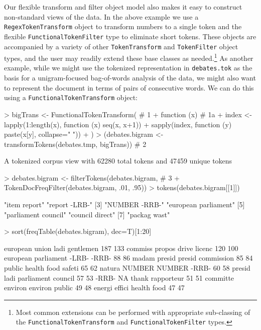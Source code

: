 \documentclass[11pt]{article}
\let\code=\texttt
\let\rclass=\texttt
\begin{document}
Our flexible transform and filter object model also makes it easy to
construct non-standard views of the data.  In the above example we use
a \rclass{RegexTokenTransform} object to transform numbers to a single
token and the flexible \rclass{FunctionalTokenFilter} type to
eliminate short tokens.  These objects are accompanied by a variety of
other \rclass{TokenTransform} and \rclass{TokenFilter} object types,
and the user may readily extend these base classes as
needed.\footnote{Most common extensions can be performed with
appropriate sub-classing of the \rclass{FunctionalTokenTransform} and
\rclass{FunctionalTokenFilter} types.}  As another example, while we
might use the tokenized representation in \code{debates.tok} as the
basis for a unigram-focused bag-of-words analysis of the data, we
might also want to represent the document in terms of pairs of
consecutive words.  We can do this using a
\rclass{FunctionalTokenTransform} object:
\begin{Schunk}
\begin{Sinput}
> bigTrans <- FunctionalTokenTransform(                         # 1
+   function (x) {                                              # 1a
+     index <- lapply(1:length(x), function (x) seq(x, x+1))
+     sapply(index, function (y) paste(x[y], collapse=" "))
+   })
> (debates.bigram <- transformTokens(debates.tmp, bigTrans))    # 2
\end{Sinput}
\begin{Soutput}
A tokenized corpus view with 62280 total tokens and 47459 unique tokens
\end{Soutput}
\begin{Sinput}
> debates.bigram <- filterTokens(debates.bigram,                # 3
+   TokenDocFreqFilter(debates.bigram, .01, .95))
> tokens(debates.bigram[[1]])
\end{Sinput}
\begin{Soutput}
[1] "item report"         "report -LRB-"       
[3] "NUMBER -RRB-"        "european parliament"
[5] "parliament council"  "council direct"     
[7] "packag wast"        
\end{Soutput}
\begin{Sinput}
> sort(freqTable(debates.bigram), dec=T)[1:20]
\end{Sinput}
\begin{Soutput}
     european union      ladi gentlemen 
                187                 133 
     commiss propos        drive licenc 
                120                 100 
european parliament         -LRB- -RRB- 
                 88                  86 
       madam presid   presid commission 
                 85                  84 
      public health         food safeti 
                 65                  62 
      natura NUMBER        NUMBER -RRB- 
                 60                  58 
        presid ladi  parliament council 
                 57                  53 
           -RRB- NA    thank rapporteur 
                 51                  51 
   committe environ      environ public 
                 49                  48 
      energi effici         health food 
                 47                  47 
\end{Soutput}
\end{Schunk}
\end{document}
